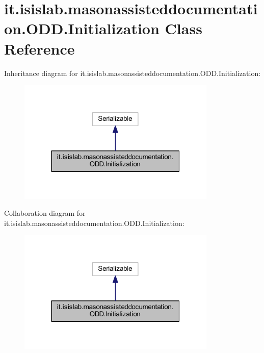 \hypertarget{classit_1_1isislab_1_1masonassisteddocumentation_1_1_o_d_d_1_1_initialization}{\section{it.\-isislab.\-masonassisteddocumentation.\-O\-D\-D.\-Initialization Class Reference}
\label{classit_1_1isislab_1_1masonassisteddocumentation_1_1_o_d_d_1_1_initialization}
}


Inheritance diagram for it.\-isislab.\-masonassisteddocumentation.\-O\-D\-D.\-Initialization\-:
\nopagebreak
\begin{figure}[H]
\begin{center}
\leavevmode
\includegraphics[width=268pt]{classit_1_1isislab_1_1masonassisteddocumentation_1_1_o_d_d_1_1_initialization__inherit__graph}
\end{center}
\end{figure}


Collaboration diagram for it.\-isislab.\-masonassisteddocumentation.\-O\-D\-D.\-Initialization\-:
\nopagebreak
\begin{figure}[H]
\begin{center}
\leavevmode
\includegraphics[width=268pt]{classit_1_1isislab_1_1masonassisteddocumentation_1_1_o_d_d_1_1_initialization__coll__graph}
\end{center}
\end{figure}
